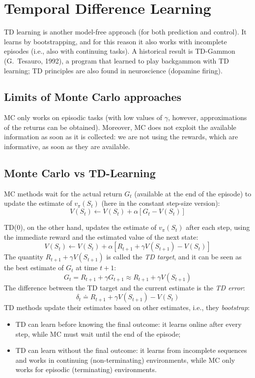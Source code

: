 \chapter{Temporal Difference Learning}
TD learning is another model-free approach (for both prediction and control). It learns by bootstrapping, and for this reason it also works with incomplete episodes (i.e., also with continuing tasks). A historical result is TD-Gammon (G.~Tesauro, 1992), a program that learned to play backgammon with TD learning; TD principles are also found in neuroscience (dopamine firing).

\section{Limits of Monte Carlo approaches}
MC only works on episodic tasks (with low values of $\gamma$, however, approximations of the returns can be obtained). Moreover, MC does not exploit the available information as soon as it is collected: we are not using the rewards, which are informative, as soon as they are available.

\section{Monte Carlo vs TD-Learning}

MC methods wait for the actual return $G_t$ (available at the end of the episode) to update the estimate of $v_\pi(S_t)$ (here in the constant step-size version):
\[V(S_t)\leftarrow V(S_t) + \alpha [G_t - V(S_t)]\]

TD(0), on the other hand, updates the estimate of $v_\pi(S_t)$ after each step, using the immediate reward and the estimated value of the next state:
\[V(S_t)\leftarrow V(S_t) + \alpha [R_{t+1} + \gamma V(S_{t+1}) - V(S_t)]\]
The quantity $R_{t+1}+\gamma V(S_{t+1})$ is called the \textit{TD target}, and it can be seen as the best estimate of $G_t$ at time $t+1$:
\[G_t=R_{t+1}+\gamma G_{t+1}\approx R_{t+1}+\gamma V(S_{t+1})\]
The difference between the TD target and the current estimate is the \textit{TD error}:
\[\delta_t\doteq R_{t+1}+\gamma V(S_{t+1})-V(S_t)\]
TD methods update their estimates based on other estimates, i.e., they \textit{bootstrap}:
\begin{itemize}
    \item TD can learn before knowing the final outcome: it learns online after every step, while MC must wait until the end of the episode;
    \item TD can learn without the final outcome: it learns from incomplete sequences and works in continuing (non-terminating) environments, while MC only works for episodic (terminating) environments.
\end{itemize}


